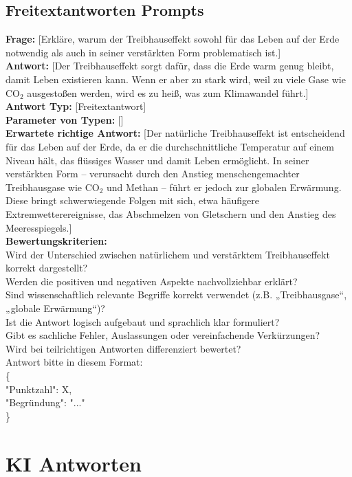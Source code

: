 \documentclass[a4paper,12pt]{article}
\begin{document}
\subsection{Freitextantworten Prompts}

\textbf{Frage:} [Erkläre, warum der Treibhauseffekt sowohl für das Leben auf der Erde notwendig als auch in seiner verstärkten Form problematisch ist.] \\
\textbf{Antwort:} [Der Treibhauseffekt sorgt dafür, dass die Erde warm genug bleibt, damit Leben existieren kann. Wenn er aber zu stark wird, weil zu viele Gase wie CO$_2$ ausgestoßen werden, wird es zu heiß, was zum Klimawandel führt.] \\
\textbf{Antwort Typ:} [Freitextantwort] \\
\textbf{Parameter von Typen:} [] \\
\textbf{Erwartete richtige Antwort:} [Der natürliche Treibhauseffekt ist entscheidend für das Leben auf der Erde, da er die durchschnittliche Temperatur auf einem Niveau hält, das flüssiges Wasser und damit Leben ermöglicht. In seiner verstärkten Form – verursacht durch den Anstieg menschengemachter Treibhausgase wie CO$_2$ und Methan – führt er jedoch zur globalen Erwärmung. Diese bringt schwerwiegende Folgen mit sich, etwa häufigere Extremwetterereignisse, das Abschmelzen von Gletschern und den Anstieg des Meeresspiegels.] \\
\textbf{Bewertungskriterien:} \\
Wird der Unterschied zwischen natürlichem und verstärktem Treibhauseffekt korrekt dargestellt? \\
Werden die positiven und negativen Aspekte nachvollziehbar erklärt? \\
Sind wissenschaftlich relevante Begriffe korrekt verwendet (z.B. „Treibhausgase“, „globale Erwärmung“)? \\
Ist die Antwort logisch aufgebaut und sprachlich klar formuliert? \\
Gibt es sachliche Fehler, Auslassungen oder vereinfachende Verkürzungen? \\
Wird bei teilrichtigen Antworten differenziert bewertet? \\
Antwort bitte in diesem Format: \\
\{ \\
"Punktzahl": X, \\
"Begründung": "..." \\
\}

\section{KI Antworten}
\end{document}
